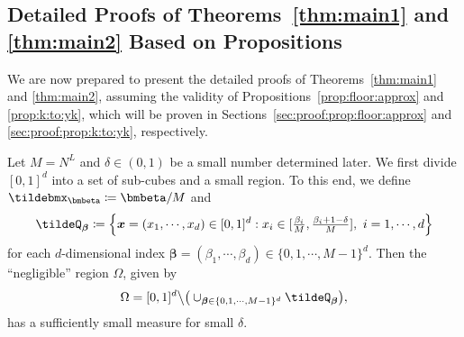 \documentclass[11pt,a4paper]{article}
\begin{document}


\subsection{Detailed Proofs of Theorems~\ref{thm:main1} and \ref{thm:main2} Based on Propositions}
\label{sec:detailed:proof:thm:main}

We are now prepared to present the detailed proofs of Theorems~\ref{thm:main1} and \ref{thm:main2}, assuming the validity of Propositions~\ref{prop:floor:approx} and \ref{prop:k:to:yk}, which will be proven in Sections~\ref{sec:proof:prop:floor:approx} and \ref{sec:proof:prop:k:to:yk}, respectively.



	
	

Let $M=N^L$ and $\delta\in (0,1)$ be a small number determined later.
We first divide $[0,1]^d$ into a set of sub-cubes  and a small region. To this end, we
define  $\tildebmx_\bmbeta \coloneqq \bmbeta/M$ and 
\[
\tildeQ_{\bm{\beta}}\coloneqq\Big\{{\bm{x}}= (x_1,\cdots,x_d) \in [0,1]^d:x_i\in[\tfrac{\beta_i}{M},\tfrac{\beta_i+1-\delta}{M}], \ i=1,\cdots,d\Big\}
\]
for each $d$-dimensional index  ${\bm{\beta}}= (\beta_1,\cdots,\beta_d) \in \{0,1,\cdots,M-1\}^d$. Then the ``negligible'' region $\Omega$, given by
\[\Omega=[0,1]^d\big\backslash \big(\cup_{\bm{\beta}\in \{0,1,\cdots,M-1\}^d}\tildeQ_{\bm{\beta}}\big),\]
has a sufficiently small measure for small \(\delta\).
\end{document}
